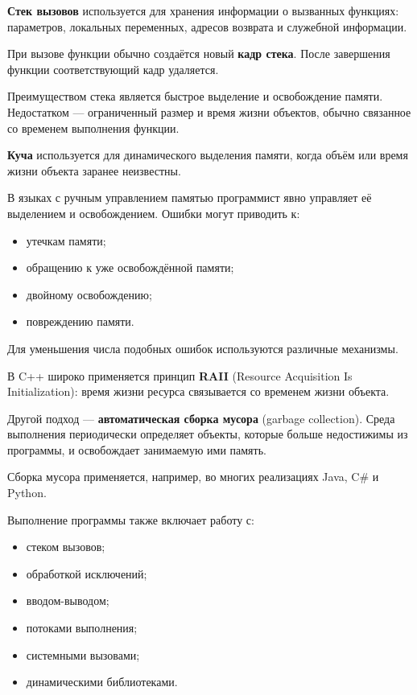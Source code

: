 \textbf{Стек вызовов} используется для хранения информации о вызванных
функциях: параметров, локальных переменных, адресов возврата и служебной
информации.

При вызове функции обычно создаётся новый \textbf{кадр стека}. После
завершения функции соответствующий кадр удаляется.

Преимуществом стека является быстрое выделение и освобождение памяти.
Недостатком --- ограниченный размер и время жизни объектов, обычно связанное
со временем выполнения функции.

\textbf{Куча} используется для динамического выделения памяти, когда объём
или время жизни объекта заранее неизвестны.

В языках с ручным управлением памятью программист явно управляет её
выделением и освобождением. Ошибки могут приводить к:

\begin{itemize}
	\item утечкам памяти;
	\item обращению к уже освобождённой памяти;
	\item двойному освобождению;
	\item повреждению памяти.
\end{itemize}

Для уменьшения числа подобных ошибок используются различные механизмы.

В C++ широко применяется принцип \textbf{RAII}
(Resource Acquisition Is Initialization): время жизни ресурса связывается со
временем жизни объекта.

Другой подход --- \textbf{автоматическая сборка мусора}
(garbage collection). Среда выполнения периодически определяет объекты, которые
больше недостижимы из программы, и освобождает занимаемую ими память.

Сборка мусора применяется, например, во многих реализациях Java, C\# и Python.

Выполнение программы также включает работу с:

\begin{itemize}
	\item стеком вызовов;
	\item обработкой исключений;
	\item вводом-выводом;
	\item потоками выполнения;
	\item системными вызовами;
	\item динамическими библиотеками.
\end{itemize}

